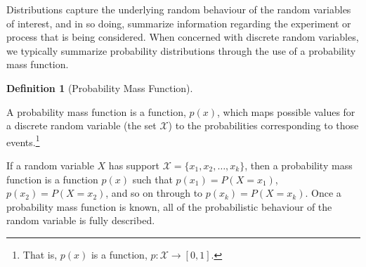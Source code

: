 \documentclass[
  letterpaper,
  DIV=11,
  numbers=noendperiod]{scrreprt}
\theoremstyle{definition}
\theoremstyle{definition}
\theoremstyle{definition}
\newtheorem{definition}{Definition}[chapter]
\theoremstyle{remark}
\begin{document}
Distributions capture the underlying random behaviour of the random
variables of interest, and in so doing, summarize information regarding
the experiment or process that is being considered. When concerned with
discrete random variables, we typically summarize probability
distributions through the use of a probability mass function.

\begin{definition}[Probability Mass
Function]\protect\hypertarget{def-probability-mass-function}{}\label{def-probability-mass-function}

A probability mass function is a function, \(p(x)\), which maps possible
values for a discrete random variable (the set \(\mathcal{X}\)) to the
probabilities corresponding to those events.\footnote{That is, \(p(x)\)
  is a function, \(p\colon\mathcal{X}\to[0,1]\).}

\end{definition}

If a random variable \(X\) has support
\(\mathcal{X} = \{x_1,x_2,\dots,x_k\}\), then a probability mass
function is a function \(p(x)\) such that \(p(x_1) = P(X = x_1)\),
\(p(x_2) = P(X = x_2)\), and so on through to \(p(x_k) = P(X=x_k)\).
Once a probability mass function is known, all of the probabilistic
behaviour of the random variable is fully described.
\end{document}
